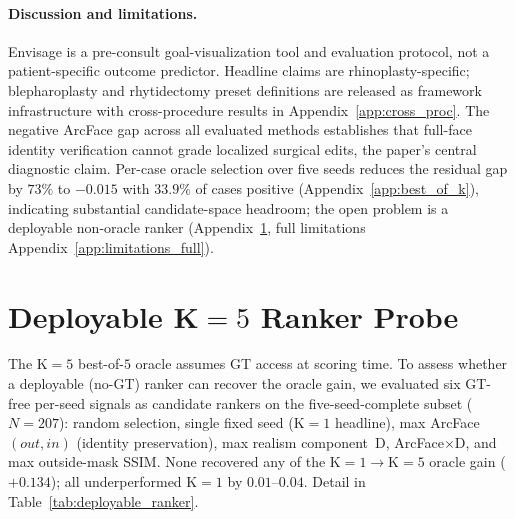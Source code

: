 \documentclass{article}
\newcommand{\method}{Envisage}
\begin{document}
\paragraph{Discussion and limitations.}\label{sec:discussion}\label{sec:conclusion}\label{sec:limitations}
\method{} is a pre-consult goal-visualization tool and evaluation protocol,
not a patient-specific outcome predictor. Headline claims are
rhinoplasty-specific; blepharoplasty and rhytidectomy preset definitions
are released as framework infrastructure with cross-procedure results in
Appendix~\ref{app:cross_proc}. The negative ArcFace gap across all
evaluated methods establishes that full-face identity verification cannot
grade localized surgical edits, the paper's central diagnostic claim.
Per-case oracle selection over five seeds reduces the residual gap by
$73\%$ to $-0.015$ with $33.9\%$ of cases positive
(Appendix~\ref{app:best_of_k}), indicating substantial candidate-space
headroom; the open problem is a deployable non-oracle ranker
(Appendix~\ref{app:deployable_ranker}, full limitations
Appendix~\ref{app:limitations_full}).






\appendix

\section{Deployable K$=5$ Ranker Probe}
\label{app:deployable_ranker}

The K$=5$ best-of-$5$ oracle assumes GT access at scoring time. To assess
whether a deployable (no-GT) ranker can recover the oracle gain, we
evaluated six GT-free per-seed signals as candidate rankers on the
five-seed-complete subset ($N{=}207$): random selection, single fixed seed
(K$=1$ headline), max ArcFace$(out, in)$ (identity preservation), max
realism component~D, ArcFace$\times$D, and max outside-mask SSIM.
None recovered any of the K$=1{\rightarrow}$K$=5$ oracle gain
($+0.134$); all underperformed K$=1$ by $0.01$--$0.04$. Detail in
Table~\ref{tab:deployable_ranker}.
\end{document}

